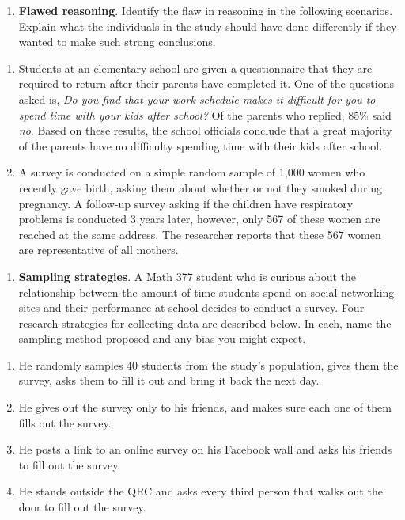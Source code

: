 \documentclass[
]{book}
\providecommand{\tightlist}{%
  \setlength{\itemsep}{0pt}\setlength{\parskip}{0pt}}
\begin{document}
\begin{enumerate}
\def\labelenumi{\arabic{enumi}.}
\setcounter{enumi}{1}
\tightlist
\item
  \textbf{Flawed reasoning}. Identify the flaw in reasoning in the following scenarios. Explain what the individuals in the study should have done differently if they wanted to make such strong conclusions.
\end{enumerate}

\begin{enumerate}
\def\labelenumi{\alph{enumi}.}
\tightlist
\item
  Students at an elementary school are given a questionnaire that they are required to return after their parents have completed it. One of the questions asked is, \emph{Do you find that your work schedule makes it difficult for you to spend time with your kids after school?} Of the parents who replied, 85\% said \emph{no}. Based on these results, the school officials conclude that a great majority of the parents have no difficulty spending time with their kids after school.\\
\item
  A survey is conducted on a simple random sample of 1,000 women who recently gave birth, asking them about whether or not they smoked during pregnancy. A follow-up survey asking if the children have respiratory problems is conducted 3 years later, however, only 567 of these women are reached at the same address. The researcher reports that these 567 women are representative of all mothers.
\end{enumerate}

\begin{enumerate}
\def\labelenumi{\arabic{enumi}.}
\setcounter{enumi}{2}
\tightlist
\item
  \textbf{Sampling strategies}. A Math 377 student who is curious about the relationship between the amount of time students spend on social networking sites and their performance at school decides to conduct a survey. Four research strategies for collecting data are described below. In each, name the sampling method proposed and any bias you might expect.
\end{enumerate}

\begin{enumerate}
\def\labelenumi{\alph{enumi}.}
\tightlist
\item
  He randomly samples 40 students from the study's population, gives them the survey, asks them to fill it out and bring it back the next day.\\
\item
  He gives out the survey only to his friends, and makes sure each one of them fills out the survey.\\
\item
  He posts a link to an online survey on his Facebook wall and asks his friends to fill out the survey.\\
\item
  He stands outside the QRC and asks every third person that walks out the door to fill out the survey.
\end{enumerate}
\end{document}
